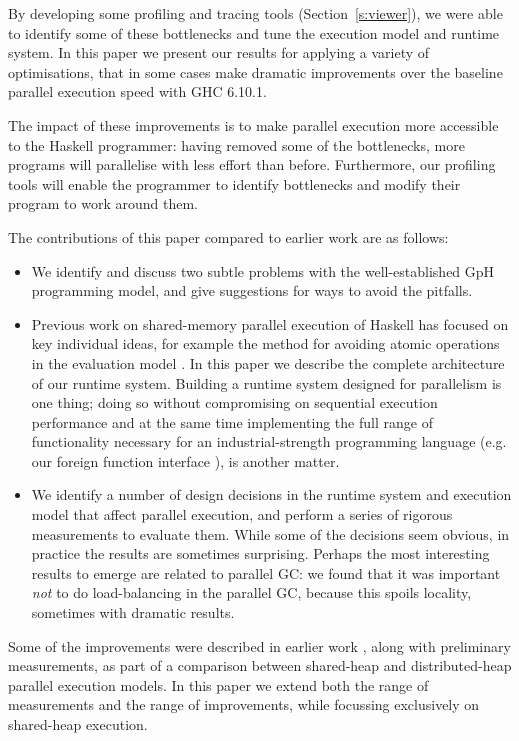 \documentclass[twocolumn,9pt]{sigplanconf}
\begin{document}
By developing some profiling and tracing tools
(Section~\ref{s:viewer}), we were able to identify some of these
bottlenecks and tune the execution model and runtime system.  In this
paper we present our results for applying a variety of optimisations,
that in some cases make dramatic improvements over the baseline
parallel execution speed with GHC 6.10.1.

The impact of these improvements is to make parallel execution more
accessible to the Haskell programmer: having removed some of the
bottlenecks, more programs will parallelise with less effort than
before.  Furthermore, our profiling tools will enable the programmer
to identify bottlenecks and modify their program to work around them.

The contributions of this paper compared to earlier work are as
follows:

\begin{itemize}
\item We identify and discuss two subtle problems with the
  well-established GpH programming model, and give suggestions for
  ways to avoid the pitfalls.

\item Previous work on shared-memory parallel execution of Haskell has
  focused on key individual ideas, for example the method for
  avoiding atomic operations in the evaluation model
  \cite{multiproc05}.  In this paper we describe the complete
  architecture of our runtime system.  Building a
  runtime system designed for parallelism is one thing; doing so
  without compromising on sequential execution performance and at the
  same time implementing the full range of functionality necessary for
  an industrial-strength programming language (e.g. our foreign
  function interface \cite{concffi04}), is another matter.

\item We identify a number of design decisions in the runtime system
  and execution model that affect parallel execution, and perform a
  series of rigorous measurements to evaluate them.  While some of the
  decisions seem obvious, in practice the results are sometimes
  surprising.  Perhaps the most interesting results to emerge are
  related to parallel GC: we found that it was important \emph{not} to
  do load-balancing in the parallel GC, because this spoils locality,
  sometimes with dramatic results.

\end{itemize}

Some of the improvements were described in earlier work
\cite{berthold:comparing}, along with preliminary measurements, as
part of a comparison between shared-heap and distributed-heap
parallel execution models.  In this paper we extend both the range of
measurements and the range of improvements, while focussing
exclusively on shared-heap execution.
\end{document}
